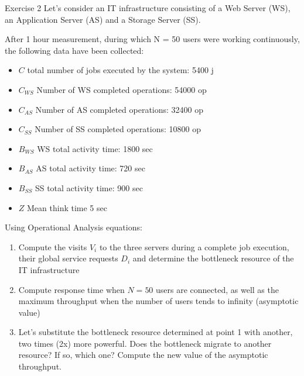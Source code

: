 \documentclass[handout]{beamer}
\begin{document}
\begin{frame}[allowframebreaks]{Exercise 2}
Let’s consider an IT infrastructure consisting of a Web Server (WS), an Application Server (AS) and a Storage Server (SS).

After 1 hour measurement, during which N = 50 users were working continuously, the following
data have been collected:
\begin{itemize}
\item $C$ total number of jobs executed by the system: 5400 j
\item $C_{WS}$ Number of WS completed operations: 54000 op
\item $C_{AS}$ Number of AS completed operations: 32400 op
\item $C_{SS}$ Number of SS completed operations: 10800 op
\item $B_{WS}$ WS total activity time: 1800 sec
\item $B_{AS}$ AS total activity time: 720 sec
\item $B_{SS}$ SS total activity time: 900 sec
\item $Z$ Mean think time 5 sec
\end{itemize}

Using Operational Analysis equations:
\begin{enumerate}
\item Compute the visits $V_i$ to the three servers during a complete job execution, their global service requests $D_i$ and determine the bottleneck resource of the IT infrastructure
\item Compute response time when $N = 50$ users are connected, as well as the maximum throughput when the number of users tends to infinity (asymptotic value)
\item Let’s substitute the bottleneck resource determined at point 1 with another, two times (2x) more powerful. Does the bottleneck migrate to another resource? If so, which one? Compute the new value of the asymptotic throughput.
\end{enumerate}
\end{frame}
\end{document}
